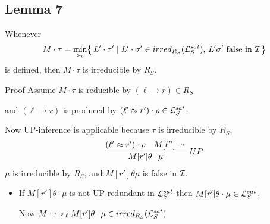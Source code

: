 \documentclass[%
handout,
]{beamer}
\begin{document}
\subsection{Lemma 7}
\begin{frame}[allowframebreaks]
    \begin{lemma}\label{irreducible}
        Whenever
        \begin{gather*}
            M\cdot\tau = \min_{\mathrel\succ_{\!\ell}}\!
            \left\{\,
            L'\cdot\tau' \mid
            L'\cdot\sigma' \in irred_{R_S}(\mathcal{L}_S^{sat}),\,
            L'\sigma'\text{ false in }\mathcal{I}\,
            \right\}
        \end{gather*}
        is defined, then $M\cdot\tau$ is irreducible by $R_S$.
    \end{lemma}

    \begin{block}{Proof}
        Assume $M\cdot\tau$ is reducible by $(\ell\to r)\in R_S$

        and $(\ell\to r)$ is produced by $(\ell'\approx r')\cdot\rho\in\mathcal{L}_S^{sat}$.

        \vspace{0.7em}
        Now UP-inference is applicable because $\tau$ is irreducible by $R_S$,
        \begin{gather*}
            \infer[UP]
            {M[r']\theta\cdot\mu}
            {(\ell'\mEQ r')\cdot\rho & M[\ell'']\cdot\tau}
        \end{gather*}
        $\mu$ is irreducible by $R_S$, and $M[r']\theta\mu${ is false in }$\mathcal{I}$.
        \hfill\lightning
    \end{block}

    \framebreak



        \begin{itemize}
            \item If $M[r']\theta\cdot\mu$ is not UP-redundant in $\mathcal{L}_S^{sat}$
            then $M[r']\theta\cdot\mu\in\mathcal{L}_S^{sat}$.

            \vspace{0.7em}
            Now $M\cdot\tau\mathrel\succ_{\!\ell}
            M[r']\theta\cdot\mu\in irred_{R_S}(\mathcal{L}_S^{sat})$


\end{itemize}
\end{frame}
\end{document}
